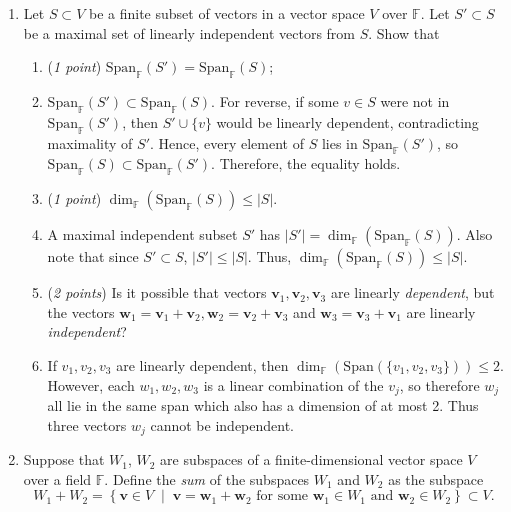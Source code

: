 \documentclass[11pt]{article}
\newcommand{\bbF}{\mathbb{F}}
\newcommand{\bbR}{\mathbb{R}}
\theoremstyle{definition}
\numberwithin{equation}{subsection}
\begin{document}
\begin{enumerate}
\begin{enumerate}
\item[(d)] (\emph{2 points}) $V=\mathbb{R}[t]_{\leq 3}$; $W=\left\{p(t)=a+bt+ct^2+dt^3 \;\;\Big|\;\; p'(2)=0\right\}$
\item[] $b+4c+12d=0 \Rightarrow b=-4c-12d$. $a,c,d$ free. $p(t)=a+(-4c-12d)t+ct^2+dt^3$. Therefore a basis is \{$(1, t^2-4t,t^3-12t)$\}.
\item[] $\dim_{\bbR}(W)=3$.

\end{enumerate}

\item Let $S \subset V$ be a finite subset of vectors in a vector space $V$ over $\bbF$. Let $S'\subset S$ be a maximal set of linearly independent vectors from $S$. Show that 
\begin{enumerate}
\item (\emph{1 point}) $\mathrm{Span}_{\bbF}(S') = \mathrm{Span}_{\bbF}(S)$;
\item[] $\mathrm{Span}_{\bbF}(S') \subset \mathrm{Span}_{\bbF}(S)$. For reverse, if some $v\in S$ were not in $\mathrm{Span}_{\bbF}(S')$, then $S' \cup \{v\}$ would be linearly dependent, contradicting maximality of $S'$. Hence, every element of $S$ lies in $\mathrm{Span}_{\bbF}(S')$, so $\mathrm{Span}_{\bbF}(S) \subset \mathrm{Span}_{\bbF}(S')$. Therefore, the equality holds.
\item (\emph{1 point}) $\dim_{\bbF}(\mathrm{Span}_{\bbF}(S))\leq |S|$.
\item[] A maximal independent subset $S'$ has $|S'|=\dim_{\bbF}(\mathrm{Span}_{\bbF}(S))$. Also note that since $S' \subset S$, $|S'| \leq |S|$. Thus, $\dim_{\bbF}(\mathrm{Span}_{\bbF}(S)) \leq |S|$.
\item (\emph{2 points}) Is it possible that vectors $\mathbf{v}_1,\mathbf{v}_2,\mathbf{v}_3$ are linearly \emph{dependent}, but the vectors $\mathbf{w}_1=\mathbf{v}_1+\mathbf{v}_2, \mathbf{w}_2=\mathbf{v}_2+\mathbf{v}_3$ and $\mathbf{w}_3=\mathbf{v}_3+\mathbf{v}_1$ are linearly \emph{independent}?
\item[] If $v_1,v_2,v_3$ are linearly dependent, then $\dim_{\bbF}(\mathrm{Span}(\{v_1,v_2,v_3\})) \leq 2$. However, each $w_1,w_2,w_3$ is a linear combination of the $v_j$, so therefore $w_j$ all lie in the same span which also has a dimension of at most 2. Thus three vectors $w_j$ cannot be independent.
\end{enumerate}

\iffalse
\item Suppose that $W_1$, $W_2$ are subspaces of a finite-dimensional vector space $V$ over a field $\mathbb{F}$. Define the \emph{sum} of the subspaces $W_1$ and $W_2$ as the subspace
$$W_1+W_2=\left\{\mathbf{v}\in V \;\;|\;\; \text{$\mathbf{v}=\mathbf{w}_1+\mathbf{w}_2$ for some $\mathbf{w}_1\in W_1$ and $\mathbf{w}_2\in W_2$}\right\}\subset V.$$


\end{enumerate}
\end{document}
